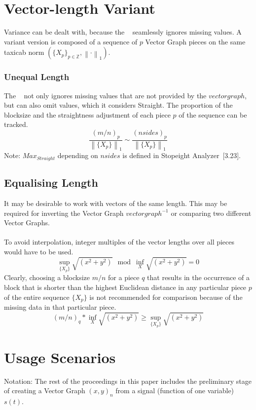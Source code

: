 \documentclass{report}
\newcommand\norm[1]{\left\lVert#1\right\rVert}
\begin{document}
\chapter{Vector-length Variant}
Variance can be dealt with, because the ~\cite[Stopeight\_Analyzer.tex]{Analyzer} seamlessly ignores missing values. A variant version is composed of a sequence of $p$ Vector Graph pieces on the same taxicab norm $(\{X_{p}\}_{p\in \mathbb{Z}},\norm{\cdot}_1)$.
\subsection*{Unequal Length}
The ~\cite[Stopeight\_Analyzer.tex]{Analyzer} not only ignores missing values that are not provided by the $vectorgraph$, but can also omit values, which it considers Straight. The proportion of the blocksize and the straightness adjustment of each piece $p$ of the sequence can be tracked.
\begin{equation}
\frac{(m/n)_{p}}{\norm{\{X_{p}\}}_{1}} \sim \frac{(nsides)_{p}}{\norm{\{X_{p}\}}_{1}}
\end{equation}
Note: $Max_{Straight}$ depending on $nsides$ is defined in Stopeight Analyzer~\cite{Analyzer}[3.23].
\section{Equalising Length}
It may be desirable to work with vectors of the same length. This may be required for inverting the Vector Graph $vectorgraph^{-1}$ or comparing two different Vector Graphs.\\\\
To avoid interpolation, integer multiples of the vector lengths over all pieces would have to be used.
\begin{equation}
\sup \limits _{\{X_{p}\}} \sqrt{(x^2+y^2)} \mod \inf \limits _{X} \sqrt{(x^2+y^2)} = 0
\end{equation}
Clearly, choosing a blocksize $m/n$ for a piece $q$ that results in the occurrence of a block that is shorter than the highest Euclidean distance in any particular piece $p$ of the entire sequence $\{X_{p}\}$ is not recommended for comparison because of the missing data in that particular piece.
\begin{equation}
(m/n)_{q}*\inf \limits _{X} \sqrt{(x^2+y^2)} \geq \sup \limits _{\{X_{p}\}} \sqrt{(x^2+y^2)}\label{eq:4}
\end{equation}

\chapter{Usage Scenarios}
Notation: The rest of the proceedings in this paper includes the preliminary stage of creating a Vector Graph $(x,y)_{n}$ from a signal (function of one variable) $s(t)$.
\end{document}
